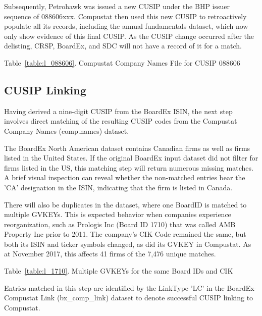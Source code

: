 \documentclass[12pt]{article}
\begin{document}
Subsequently, Petrohawk was issued a new CUSIP under the BHP issuer sequence of 088606xxx.
Compustat then used this new CUSIP to retroactively populate all its records, including the annual fundamentals dataset, which now only show evidence of this final CUSIP.
As the CUSIP change occurred after the delisting, CRSP, BoardEx, and SDC will not have a record of it for a match.

\begin{center}\label{table:l_088606}
Table~\ref{table:l_088606}. Compustat Company Names File for CUSIP 088606

\end{center}

\subsection{CUSIP Linking}\label{sec:CUSIPmatch}

Having derived a nine-digit CUSIP from the BoardEx ISIN, the next step involves direct matching of the resulting CUSIP codes from the Compustat Company Names (comp.names) dataset.

The BoardEx North American dataset contains Canadian firms as well as firms listed in the United States.
If the original BoardEx input dataset did not filter for firms listed in the US, this matching step will return numerous missing matches.
A brief visual inspection can reveal whether the non-matched entries bear the 'CA' designation in the ISIN, indicating that the firm is listed in Canada.

There will also be duplicates in the dataset, where one BoardID is matched to multiple GVKEYs.
This is expected behavior when companies experience reorganization, such as Prologis Inc (Board ID 1710) that was called AMB Property Inc prior to 2011.
The company's CIK Code remained the same, but both its ISIN and ticker symbols changed, as did its GVKEY in Compustat.
As at November 2017, this affects 41 firms of the 7,476 unique matches.

\begin{center}
Table~\ref{table:l_1710}. Multiple GVKEYs for the same Board IDs and CIK\label{table:l_1710}

\end{center}

Entries matched in this step are identified by the LinkType 'LC' in the BoardEx-Compustat Link (bx\_comp\_link) dataset to denote successful CUSIP linking to Compustat.
\end{document}
